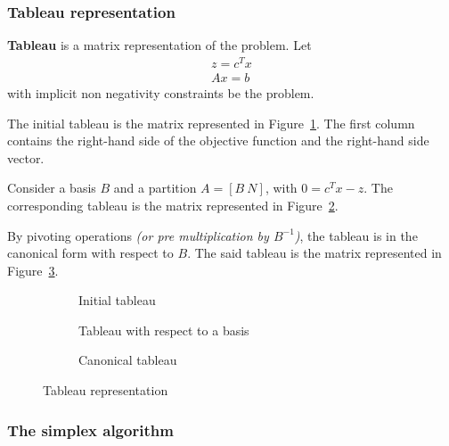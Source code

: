 \documentclass[english]{article}
\begin{document}
\subsubsection{Tableau representation}

\textbf{Tableau} is a matrix representation of the \LP problem.
Let
\[ \begin{matrix} z = c^T x \\ Ax = b \end{matrix}\] with implicit non negativity constraints be the \LP problem.

The initial tableau is the matrix represented in Figure~\ref{subfig:tableau-initial}.
The first column contains the right-hand side of the objective function and the right-hand side vector.

Consider a basis \(B\) and a partition \(A = \left[ B \ N \right]\), with \(0 = c^T x - z\).
The corresponding tableau is the matrix represented in Figure~\ref{subfig:tableau-basis}.

By pivoting operations \textit{(or pre multiplication by \(B^{-1}\))}, the tableau is in the canonical form with respect to \(B\).
The said tableau is the matrix represented in Figure~\ref{subfig:tableau-canonical}.

\begin{figure}[htbp]
  \centering
  \bigskip
  \begin{subfigure}[t]{0.99\textwidth}
    \centering
    \bigskip
    \caption{Initial tableau}
    \label{subfig:tableau-initial}
    \bigskip
  \end{subfigure}
  \bigskip
  \begin{subfigure}[b]{0.515\textwidth}
    \centering
    \bigskip
    \caption{Tableau with respect to a basis}
    \label{subfig:tableau-basis}
    \bigskip
  \end{subfigure}
  \begin{subfigure}[b]{0.475\textwidth}
    \centering
    \bigskip
    \caption{Canonical tableau}
    \label{subfig:tableau-canonical}
    \bigskip
  \end{subfigure}
  \caption{Tableau representation}
  \label{fig:tableau-representations}
  \bigskip
\end{figure}

\subsubsection{The simplex algorithm}
\end{document}
